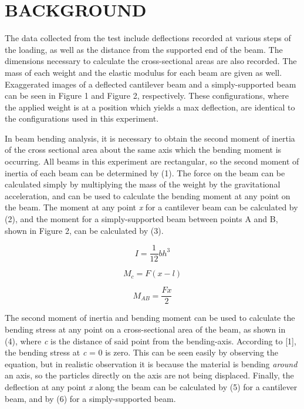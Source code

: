 \documentclass[12pt]{article}
\begin{document}
\section*{\fontsize{12}{12}\selectfont BACKGROUND}
The data collected from the test include deflections recorded at various steps of the loading, as well as the distance from the supported end of the beam. The dimensions necessary to calculate the cross-sectional areas are also recorded. The mass of each weight and the elastic modulus for each beam are given as well.
Exaggerated images of a deflected cantilever beam and a simply-supported beam can be seen in Figure 1 and Figure 2, respectively. These configurations, where the applied weight is at a position which yields a max deflection, are identical to the configurations used in this experiment.
\bigskip

In beam bending analysis, it is necessary to obtain the second moment of inertia of the cross sectional area about the same axis which the bending moment is occurring. All beams in this experiment are rectangular, so the second moment of inertia of each beam can be determined by (1). The force on the beam can be calculated simply by multiplying the mass of the weight by the gravitational acceleration, and can be used to calculate the bending moment at any point on the beam. The moment at any point \emph{x} for a cantilever beam can be calculated by (2), and the moment for a simply-supported beam between points A and B, shown in Figure 2, can be calculated by (3).
\bigskip

\begin{equation}
I = \frac{1}{12}bh^3
\end{equation}

\bigskip
\begin{equation}
M_{c} = F(x-l)
\end{equation}

\bigskip
\begin{equation}
M_{AB} = \frac{Fx}{2}
\end{equation}
\bigskip

The second moment of inertia and bending moment can be used to calculate the bending stress at any point on a cross-sectional area of the beam, as shown in (4), where \emph{c} is the distance of said point from the bending-axis. According to [1], the bending stress at \emph{c} = 0 is zero. This can be seen easily by observing the equation, but in realistic observation it is because the material is bending \emph{around} an axis, so the particles directly on the axis are not being displaced. Finally, the deflection at any point \emph{x} along the beam can be calculated by (5) for a cantilever beam, and by (6) for a simply-supported beam.
\bigskip
\end{document}
